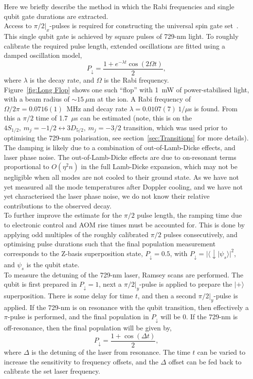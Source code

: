     Here we briefly describe the method in which the Rabi frequencies and single qubit gate durations are extracted.\\
    Access to $\pi/2|_x$-pulses is required for constructing the universal spin gate set~\cite{}. This single qubit gate is achieved by square pulses of 729-nm light. To roughly calibrate the required pulse length, extended oscillations are fitted using a damped oscillation model,
    \begin{equation}
        P_{\downarrow} = \frac{1 + e^{-\lambda t} \cos(2 \Omega t)}{2},
    \end{equation}
    where $\lambda$ is the decay rate, and $\Omega$ is the Rabi frequency.\\
    Figure~\ref{fig:Long Flop} shows one such ``flop'' with 1~mW of power-stabilised light, with a beam radius of $\sim 15 ~\mu$m at the ion. A Rabi frequency of $\Omega/2\pi = 0.0716(1)$~MHz and
    decay rate $\lambda = 0.0107(7)~1/\mu$s is found. From this a $\pi/2$ time of 1.7~$\mu$s can be estimated (note, this is on the $4S_{1/2},~m_j = -1/2 \leftrightarrow 3D_{5/2},~m_j = -3/2$ transition, which was used prior to optimising the 729-nm polarisation, see section~\ref{sec:Transitions} for more details).\\
    The damping is likely due to a combination of out-of-Lamb-Dicke effects, and laser phase noise. The out-of-Lamb-Dicke effects are due to on-resonant terms proportional to $O(\eta^2 n)$ in the full Lamb-Dicke expansion, which may not be negligible when all modes are not cooled to their ground state. As we have not yet measured all the mode temperatures after Doppler cooling, and we have not yet characterised the laser phase noise, we do not know their relative contributions to the observed decay.\\
    To further improve the estimate for the $\pi/2$ pulse length, the ramping time due to electronic control and AOM rise times must be accounted for. This is done by applying odd multiples of the roughly calibrated $\pi/2$ pulses consecutively, and optimising pulse durations such that the final population measurement corresponds to the Z-basis superposition state, $P_{\downarrow}= 0.5$, with $P_\downarrow = |\langle \downarrow | \psi_s \rangle|^2$, and $\psi_s$ is the qubit state. \\
    To measure the detuning of the 729-nm laser, Ramsey scans are performed.
    The qubit is first prepared in $P_\downarrow = 1$, next a $\pi/2|_y$-pulse is applied to prepare the $|+\rangle$ superposition. There is some delay for time $t$, and then a second
    $\pi/2|_y$-pulse is applied. If the 729-nm is on resonance with the qubit transition, then effectively a $\pi$-pulse is performed, and the final population in $P_\downarrow$ will be 0. If the 729-nm is off-resonance, then the final population will be given by,
    \begin{equation}
        P_{\downarrow} = \frac{1+\cos(\Delta t)}{2},
    \end{equation}
    where $\Delta$ is the detuning of the laser from resonance.
    The time $t$ can be varied to increase the sensitivity to frequency offsets, and the $\Delta$ offset can be fed back to calibrate the set laser frequency. \\



